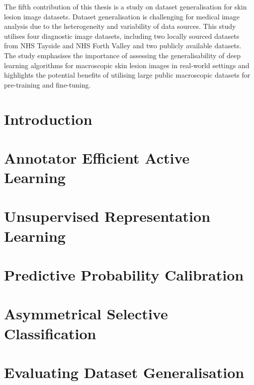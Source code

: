 \documentclass[12pt]{report}
\begin{document}
	The fifth contribution of this thesis is a study on dataset generalisation for skin lesion image datasets. Dataset generalisation is challenging for medical image analysis due to the heterogeneity and variability of data sources. This study utilises four diagnostic image datasets, including two locally sourced datasets from NHS Tayside and NHS Forth Valley and two publicly available datasets. The study emphasises the importance of assessing the generalisability of deep learning algorithms for macroscopic skin lesion images in real-world settings and highlights the potential benefits of utilising large public macroscopic datasets for pre-training and fine-tuning.
	
	
	
	\newpage
	\chapter{Introduction}
	\label{ch:introduction}
	
	
	
	\chapter{Annotator Efficient Active Learning}
	\label{ch:active_learning}
	
	
	
	\chapter{Unsupervised Representation Learning}
	\label{ch:unsupervised_representation_learning}
	
	
	
	\chapter{Predictive Probability Calibration}
	\label{ch:classification_claibration}
	
	
	
	\chapter{Asymmetrical Selective Classification}
	\label{ch:selective_classification}
	
	
	
	\chapter{Evaluating Dataset Generalisation}
	\label{ch:dataset_generalisation}
	
	
\end{document}
